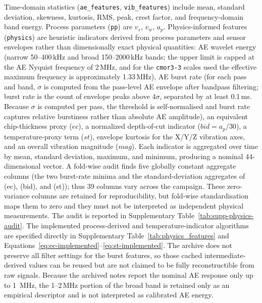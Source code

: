Time-domain statistics (\texttt{ae\_features}, \texttt{vib\_features})
include mean, standard deviation, skewness, kurtosis, RMS, peak, crest
factor, and frequency-domain band energy. Process parameters
(\texttt{pp}) are $v_s$, $v_w$, $a_p$. Physics-informed features
(\texttt{physics}) are heuristic indicators derived from process
parameters and sensor envelopes rather than dimensionally exact physical
quantities: AE wavelet energy (narrow 50--400\,kHz and broad 150--2000\,kHz
bands; the upper limit is capped at the AE Nyquist frequency of 2\,MHz,
and for the \texttt{cmor3-3} scales used the effective maximum frequency
is approximately 1.33\,MHz), AE burst rate (for each pass and band, $\sigma$ is computed from the
pass-level AE envelope after bandpass filtering; burst rate is the count
of envelope peaks above $4\sigma$, separated by at least 0.1\,ms. Because
$\sigma$ is computed per pass, the threshold is self-normalised and burst
rate captures relative burstiness rather than absolute AE amplitude), an equivalent chip-thickness proxy ($ec$), a normalized depth-of-cut
indicator ($bid=a_p/30$), a temperature-proxy term ($st$), envelope kurtosis for
the X/Y/Z vibration axes, and an overall vibration magnitude ($mag$). Each
indicator is aggregated over time by mean, standard deviation, maximum,
and minimum, producing a nominal 44-dimensional vector. A fold-wise audit
finds five globally constant aggregate columns (the two burst-rate minima
and the standard-deviation aggregates of (ec), (bid), and (st));
thus 39 columns vary across the campaign. These zero-variance columns are
retained for reproducibility, but fold-wise standardisation maps them to
zero and they must not be interpreted as independent physical
measurements. The audit is reported in Supplementary
Table~\ref{tab:supp-physics-audit}. The implemented process-derived and
temperature-indicator algorithms are specified directly in Supplementary
Table~\ref{tab:physics_features} and Equations~\eqref{eq:ec-implemented}--\eqref{eq:st-implemented}.
The archive does not preserve all filter settings for the burst features,
so those cached intermediate-derived values can be reused but are not
claimed to be fully reconstructible from raw signals. Because the
archived notes report the nominal AE response only up to 1~MHz, the 1--2\,MHz portion of
the broad band is retained only as an empirical descriptor and is not
interpreted as calibrated AE energy.

